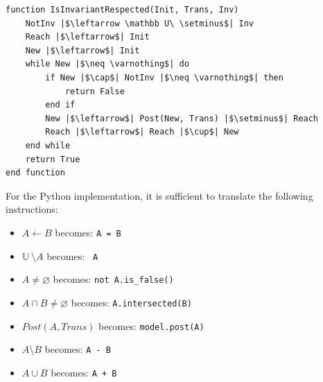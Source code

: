 \documentclass[12pt]{article}
\begin{document}
    \begin{verbatim}
function IsInvariantRespected(Init, Trans, Inv)
    NotInv |$\leftarrow \mathbb U\ \setminus$| Inv
    Reach |$\leftarrow$| Init
    New |$\leftarrow$| Init
    while New |$\neq \varnothing$| do
        if New |$\cap$| NotInv |$\neq \varnothing$| then
            return False
        end if
        New |$\leftarrow$| Post(New, Trans) |$\setminus$| Reach
        Reach |$\leftarrow$| Reach |$\cup$| New
    end while
    return True
end function
    \end{verbatim}

    For the Python implementation, it is sufficient to translate the following instructions:
    \begin{itemize}
        \item $A \leftarrow B$ becomes: \texttt{A = B}
        \item $\mathbb U\ \setminus A$ becomes: \texttt{~A}
        \item $A \neq \varnothing$ becomes: \texttt{not A.is_false()}
        \item $A \cap B \neq \varnothing$ becomes: \texttt{A.intersected(B)}
        \item $Post(A, Trans)$ becomes: \texttt{model.post(A)}
        \item $A \setminus B$ becomes: \texttt{A - B}
        \item $A \cup B$ becomes: \texttt{A + B}
    \end{itemize}
\end{document}
